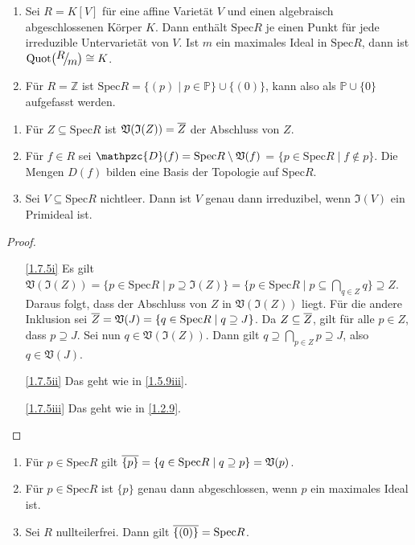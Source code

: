 \documentclass[a4paper,12pt]{scrbook}
\newtheorem{proof}{Beweis}
\def\V{\mathfrak{V}}
\def\I{\mathfrak{I}}
\def\P{\mathbb{P}}
\newcommand{\D}{\mathpzc{D}}
\newcommand{\Spec}{\mathrm{Spec}}
\newcommand{\Quot}{\mathrm{Quot}}
\newcommand{\set}[1]{\ensuremath{\mathbb{#1}}}
\newcommand{\Z}{\set{Z}}
\def\Bar#1{\ensuremath\overline{#1}}
\newcommand{\Quotient}[2]{
  \raisebox{0.7ex}{\ensuremath{#1}}
  \ensuremath{\mkern-3mu}\big/\ensuremath{\mkern-3mu}
  \raisebox{-0.6ex}{\ensuremath{#2}}}
\begin{document}
\begin{bsp}\label{1.7.4}
  \begin{enumerate}
  \item{} Sei $R=K[V]$ für eine affine Varietät $V$ und einen algebraisch abgeschlossenen Körper $K$. Dann enthält
    $\Spec R$ je einen Punkt für jede irreduzible Untervarietät von $V$. Ist $m$ ein maximales Ideal in $\Spec R$, dann ist
    $\Quot\bigl(\Quotient{R}{m}\bigr)\cong K$.
  \item{} Für $R=\Z$ ist $\Spec R = \{(p)\mid p\in\P\}\cup\{(0)\}$, kann also als $\P\cup\{0\}$ aufgefasst werden.
  \end{enumerate}
\end{bsp}

\begin{bem}\label{1.7.5}
  \begin{enumerate}
  \item{} Für $Z\subseteq\Spec R$ ist $\V(\I(Z))=\Bar{Z}$ der Abschluss von $Z$.
  \item{} Für $f\in R$ sei $\D(f)=\Spec R\setminus\V(f)$ = $\{p\in\Spec R\mid f\notin p\}$. Die Mengen $D(f)$
    bilden eine Basis der Topologie auf $\Spec R$.
  \item{} Sei $V\subseteq\Spec R$ nichtleer. Dann ist $V$ genau dann irreduzibel, wenn $\I(V)$ ein Primideal ist.
  \end{enumerate}
\end{bem}
\begin{proof}
  \begin{enumerate}
  \item[\ref{1.7.5i}] Es gilt $\V(\I(Z))=\{p\in\Spec R\mid p\supseteq\I(Z)\} = \{p\in\Spec R\mid p\subseteq\bigcap_{q\in Z}q\}
    \supseteq Z$. Daraus folgt, dass der Abschluss von $Z$ in $\V(\I(Z))$ liegt. Für die andere Inklusion sei
    $\Bar{Z}=\V(J)=\{q\in\Spec R\mid q\supseteq J\}$. Da $Z\subseteq\Bar{Z}$, gilt für alle $p\in Z$, dass $p\supseteq J$. Sei
    nun $q\in\V(\I(Z))$. Dann gilt $q\supseteq\bigcap_{p\in Z}p\supseteq J$, also $q\in\V(J)$.
  \item[\ref{1.7.5ii}] Das geht wie in \cref{1.5.9iii}.
  \item[\ref{1.7.5iii}] Das geht wie in \cref{1.2.9}.
  \end{enumerate}
\end{proof}

\begin{bem}\label{1.7.6}
  \begin{enumerate}
  \item{} Für $p\in\Spec R$ gilt $\Bar{\{p\}}=\{q\in\Spec R\mid q\supseteq p\}=\V(p)$.
  \item{} Für $p\in\Spec R$ ist $\{p\}$ genau dann abgeschlossen, wenn $p$ ein maximales Ideal ist.
  \item{} Sei $R$ nullteilerfrei. Dann gilt $\Bar{\{(0)\}}=\Spec R$.
  \end{enumerate}
\end{bem}
\end{document}
